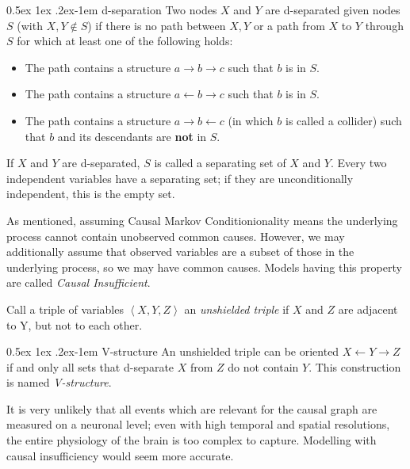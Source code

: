 \documentclass[a4paper, 10pt, english, onecolumn]{article}
\makeatletter
\renewcommand{\paragraph}{%
  \@startsection{paragraph}{4}%
  {\z@}{0.5ex \@plus 1ex \@minus .2ex}{-1em}%
  {\normalfont\normalsize\bfseries}%
}
\makeatother
\begin{document}
\paragraph{d-separation}
Two nodes $X$ and $Y$ are d-separated given nodes $S$ (with $X, Y \notin S$) if there is no path between $X,Y$ or a path from $X$ to $Y$ through $S$ for which at least one of the following holds:
\begin{itemize}
\item The path contains a structure $a \rightarrow b \rightarrow c$ such that $b$ is in $S$.
\item The path contains a structure $a \leftarrow b \rightarrow c$ such that $b$ is in $S$.
\item The path contains a structure $a \rightarrow b \leftarrow c$ (in which $b$ is called a collider) such that $b$ and its descendants are \textbf{not} in $S$.
\end{itemize}
If $X$ and $Y$ are d-separated, $S$ is called a separating set of $X$ and $Y$.
Every two independent variables have a separating set; if they are unconditionally independent, this is the empty set.

As mentioned, assuming Causal Markov Conditionionality means the underlying process cannot contain unobserved common causes.
However, we may additionally assume that observed variables are a subset of those in the underlying process, so we may have common causes.
Models having this property are called \textit{Causal Insufficient}.

Call a triple of variables $\left < X,Y,Z \right >$ an \textit{unshielded triple} if $X$ and $Z$ are adjacent to Y, but not to each other.

\paragraph{V-structure}
An unshielded triple can be oriented $X \leftarrow Y \rightarrow Z$ if and only all sets that d-separate $X$ from $Z$ do not contain $Y$.
This construction is named \textit{V-structure}.

It is very unlikely that all events which are relevant for the causal graph are measured on a neuronal level; 
even with high temporal and spatial resolutions, the entire physiology of the brain is too complex to capture.
Modelling with causal insufficiency would seem more accurate.
\end{document}
